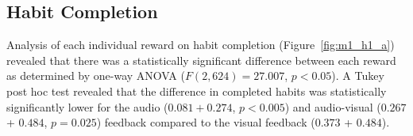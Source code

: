 \documentclass{scaffold/sigchi}
\begin{document}





\subsection{Habit Completion}
Analysis of each individual reward on habit completion (Figure~\ref{fig:m1_h1_a}) revealed that there was a statistically significant difference between each reward as determined by one-way ANOVA ($F(2,624) = 27.007$, $p < 0.05$). A Tukey post hoc test revealed that the difference in completed habits was statistically significantly lower for the audio ($0.081 + 0.274$, $p < 0.005$) and audio-visual ($0.267$ + $0.484$, $p = 0.025$) feedback compared to the visual feedback ($0.373$ + $0.484$).


\end{document}
